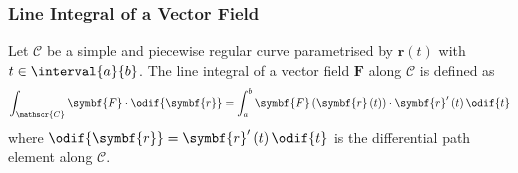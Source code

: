 \documentclass{article}
\begin{document}
\subsubsection{Line Integral of a Vector Field}
Let \(\mathscr{C}\) be a simple and piecewise regular curve
parametrised by \(\symbf{r}\left( t \right)\) with \(t \in
\interval{a}{b}\). The line integral of a vector field \(\symbf{F}\)
along \(\mathscr{C}\) is defined as
\begin{equation*}
    \int_{\mathscr{C}} \symbf{F} \cdot \odif{\symbf{r}} = \int_a^b \symbf{F}\left( \symbf{r}\left( t \right) \right) \cdot \symbf{r}'\left( t \right) \odif{t}
\end{equation*}
where \(\odif{\symbf{r}} = \symbf{r}'\left( t \right) \odif{t}\) is the
differential path element along \(\mathscr{C}\).
\end{document}
